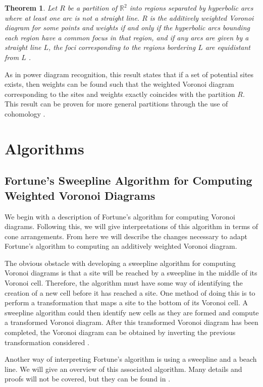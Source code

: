 \documentclass[a4paper, 11pt]{article}
\newtheorem{theorem}{Theorem}[section]
\newcommand{\R}{\mathbb{R}}
\begin{document}
\begin{theorem}
  \label{thm:add_rec}
  Let $R$ be a partition of $\R^2$ into regions separated by hyperbolic arcs where at least one arc is not a straight line. $R$ is the additively
  weighted Voronoi diagram for some points and weights if and only if the hyperbolic arcs bounding each region have a common focus in that region, and
  if any arcs are given by a straight line $L$, the foci corresponding to the regions bordering $L$ are equidistant from $L$ \cite{ash-bolker}.
\end{theorem}

As in power diagram recognition, this result states that if a set of potential sites exists, then weights can be found such that the weighted Voronoi
diagram corresponding to the sites and weights exactly coincides with the partition $R$. This result can be proven for more general partitions through
the use of cohomology \cite{ash-bolker}.

\section{Algorithms}

\subsection{Fortune's Sweepline Algorithm for Computing Weighted Voronoi Diagrams}

We begin with a description of Fortune's algorithm for computing Voronoi diagrams. Following this, we will give interpretations of this algorithm in
terms of cone arrangements. From here we will describe the changes necessary to adapt Fortune's algorithm to computing an additively weighted Voronoi
diagram.

The obvious obstacle with developing a sweepline algorithm for computing Voronoi diagrams is that a site will be reached by a sweepline in the middle
of its Voronoi cell. Therefore, the algorithm must have some way of identifying the creation of a new cell before it has reached a site. One method of
doing this is to perform a transformation that maps a site to the bottom of its Voronoi cell. A sweepline algorithm could then identify new cells as
they are formed and compute a transformed Voronoi diagram. After this transformed Voronoi diagram has been completed, the Voronoi diagram can be
obtained by inverting the previous transformation considered \cite{fortune_sweepline}.

Another way of interpreting Fortune's algorithm is using a sweepline and a beach line. We will give an overview of this associated algorithm. Many
details and proofs will not be covered, but they can be found in \cite{comp_geom}.
\end{document}
